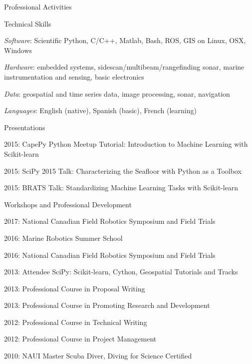 \documentclass{resume} %
\begin{document}
\begin{rSection}{Professional Activities}

\begin{rSubsection}{Technical Skills}{}{}{}
\item{\emph{Software}: Scientific Python, C/C++, Matlab, Bash, ROS, GIS on Linux, OSX, Windows}
\item{\emph{Hardware}: embedded systems, sidescan/multibeam/rangefinding sonar, marine instrumentation and sensing, basic electronics}
\item{\emph{Data}: geospatial and time series data, image processing, sonar, navigation }
\item{\emph{Languages}: English (native), Spanish (basic), French (learning)}
\end{rSubsection}

\newpage

\begin{rSubsection}{Presentations}{}{}{}
\item{2015: CapePy Python Meetup Tutorial: Introduction to Machine Learning with Scikit-learn }
\item{2015: SciPy 2015 Talk: Characterizing the Seafloor with Python as a Toolbox}
\item{2015: BRATS Talk: Standardizing Machine Learning Tasks with Scikit-learn }
\end{rSubsection}

\begin{rSubsection}{Workshops and Professional Development}{}{}{}
\item{2017: National Canadian Field Robotics Symposium and Field Trials}
\item{2016: Marine Robotics Summer School}
\item{2016: National Canadian Field Robotics Symposium and Field Trials}
\item{2013: Attendee SciPy: Scikit-learn, Cython, Geospatial Tutorials and Tracks}
\item{2013: Professional Course in Proposal Writing}
\item{2013: Professional Course in Promoting Research and Development}
\item{2012: Professional Course in Technical Writing}
\item{2012: Professional Course in Project Management}
\item{2010: NAUI Master Scuba Diver, Diving for Science Certified}
\end{rSubsection}



\end{rSection}
\end{document}
